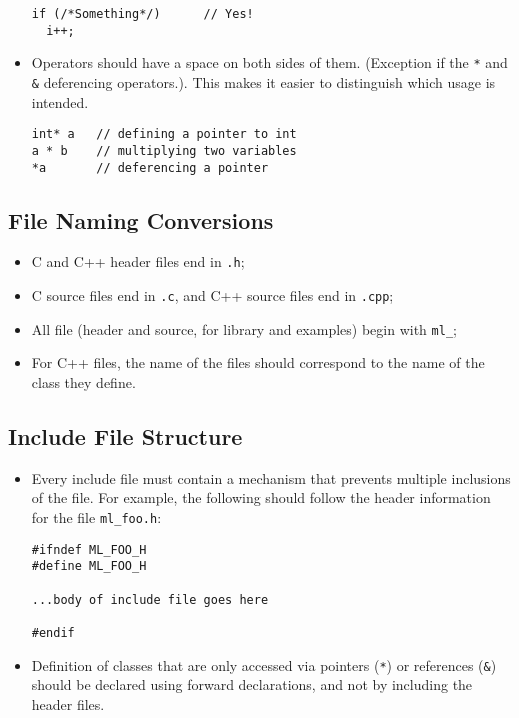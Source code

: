 \documentclass[10pt,letter,relax]{SANDreport}
\begin{document}
\begin{itemize}
\begin{verbatim}
if (/*Something*/)      // Yes!
  i++;
\end{verbatim}
\item Operators should have a space on both sides of them. 
(Exception if the \verb!*! and \verb!&! deferencing operators.). This makes it
easier to distinguish which usage is intended.
\begin{verbatim}
int* a   // defining a pointer to int
a * b    // multiplying two variables
*a       // deferencing a pointer
\end{verbatim}
\end{itemize}

\subsection{File Naming Conversions}

\begin{itemize}
\item C and C++ header files end in \verb!.h!;
\item C source files end in \verb!.c!, and C++ source files end in
\verb!.cpp!;
\item All file (header and source, for library and examples) begin with \verb!ml_!;
\item For C++ files, the name of the files should correspond to the name of
the class they define.
\end{itemize}

\subsection{Include File Structure}

\begin{itemize}
\item Every include file must contain a mechanism that prevents multiple
inclusions of the file. For example, the following should follow the header
information for the file \verb!ml_foo.h!:
\begin{verbatim}
#ifndef ML_FOO_H
#define ML_FOO_H

...body of include file goes here

#endif
\end{verbatim}
\item Definition of classes that are only accessed via pointers (\verb!*!) or
references (\verb!&!) should be declared using forward declarations, and not by
including the header files.
\end{itemize}
\end{document}
